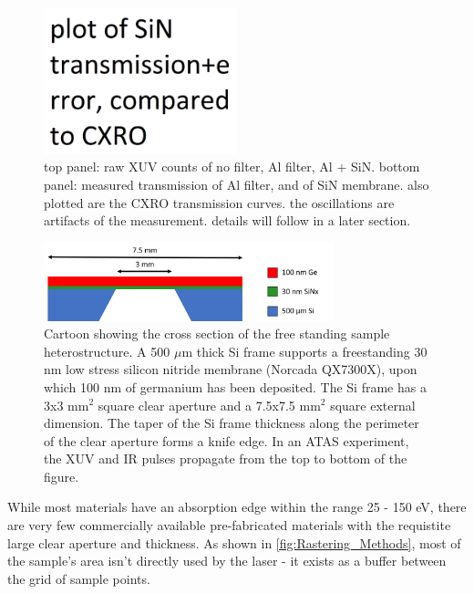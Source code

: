 \begin{figure}
	\centering
	\includegraphics[width=0.5\textwidth]{figures/chap3/Nitride_transmission.png}
	\caption{top panel: raw XUV counts of no filter, Al filter, Al + SiN. bottom panel: measured transmission of Al filter, and of SiN membrane. also plotted are the CXRO transmission curves. the oscillations are artifacts of the measurement. details will follow in a later section.}
	\label{fig:Nitride_transmission}
\end{figure}

\begin{figure}
	\centering
	\includegraphics[width=0.75\textwidth]{figures/chap3/Sample_Geometry.png}
	\caption{Cartoon showing the cross section of the free standing sample heterostructure. A 500 $\mu$m thick Si frame supports a freestanding 30 nm low stress silicon nitride membrane (Norcada QX7300X), upon which 100 nm of germanium has been deposited. The Si frame has a 3x3 mm$^2$ square clear aperture and a 7.5x7.5 mm$^2$ square external dimension. The taper of the Si frame thickness along the perimeter of the clear aperture forms a knife edge. In an ATAS experiment, the XUV and IR pulses propagate from the top to bottom of the figure.}
	\label{fig:Sample_Geometry}
\end{figure}

While most materials have an absorption edge within the range 25 - 150 eV, there are very few commercially available pre-fabricated materials with the requistite large clear aperture and thickness. As shown in \cref{fig:Rastering_Methods}, most of the sample's area isn't directly used by the laser - it exists as a buffer between the grid of sample points.

